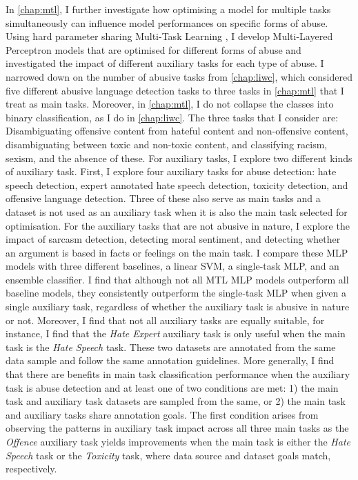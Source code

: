 In \cref{chap:mtl}, I further investigate how optimising a model for multiple tasks simultaneously can influence model performances on specific forms of abuse.
Using hard parameter sharing Multi-Task Learning \citep{Caruana:1993}, I develop Multi-Layered Perceptron models that are optimised for different forms of abuse and investigated the impact of different auxiliary tasks for each type of abuse.
I narrowed down on the number of abusive tasks from \cref{chap:liwc}, which considered five different abusive language detection tasks to three tasks in \cref{chap:mtl} that I treat as main tasks.
Moreover, in \cref{chap:mtl}, I do not collapse the classes into binary classification, as I do in \cref{chap:liwc}.
The three tasks that I consider are: Disambiguating offensive content from hateful content and non-offensive content, disambiguating between toxic and non-toxic content, and classifying racism, sexism, and the absence of these.
For auxiliary tasks, I explore two different kinds of auxiliary task.
First, I explore four auxiliary tasks for abuse detection: hate speech detection, expert annotated hate speech detection, toxicity detection, and offensive language detection.
Three of these also serve as main tasks and a dataset is not used as an auxiliary task when it is also the main task selected for optimisation.
For the auxiliary tasks that are not abusive in nature, I explore the impact of sarcasm detection, detecting moral sentiment, and detecting whether an argument is based in facts or feelings on the main task.
I compare these MLP models with three different baselines, a linear SVM, a single-task MLP, and an ensemble classifier.
I find that although not all MTL MLP models outperform all baseline models, they consistently outperform the single-task MLP when given a single auxiliary task, regardless of whether the auxiliary task is abusive in nature or not.
Moreover, I find that not all auxiliary tasks are equally suitable, for instance, I find that the \textit{Hate Expert} auxiliary task is only useful when the main task is the \textit{Hate Speech} task. 
These two datasets are annotated from the same data sample and follow the same annotation guidelines.
More generally, I find that there are benefits in main task classification performance when the auxiliary task is abuse detection and at least one of two conditions are met:
1) the main task and auxiliary task datasets are sampled from the same, or 2) the main task and auxiliary tasks share annotation goals.
The first condition arises from observing the patterns in auxiliary task impact across all three main tasks as the \textit{Offence} auxiliary task yields improvements when the main task is either the \textit{Hate Speech} task or the \textit{Toxicity} task, where data source and dataset goals match, respectively.
